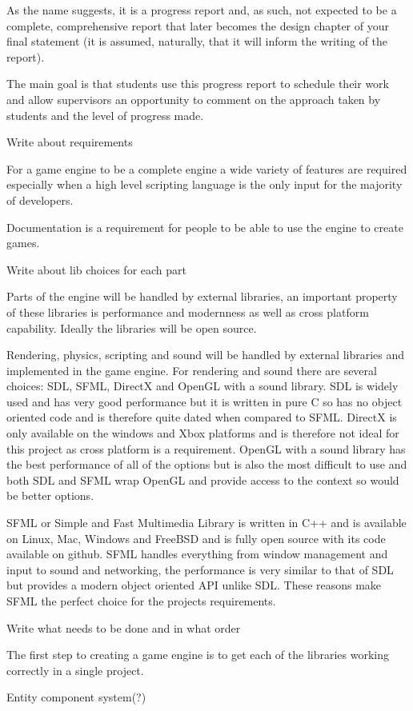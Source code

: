 \documentclass[11pt,a4paper,titlepage]{article}
\begin{document}
As the name suggests, it is a progress report and, as such, not expected to be a complete, comprehensive report
that later becomes the design chapter of your final statement (it is assumed, naturally, that it will inform the
writing of the report).  

The main goal is that students use this progress report to schedule their work and allow supervisors an opportunity to comment on the approach taken by students and the level of progress made.

Write about requirements

	For a game engine to be a complete engine a wide variety of features are required especially when a high level scripting language is the only input for the majority of developers.

	Documentation is a requirement for people to be able to use the engine to create games.

Write about lib choices for each part

	Parts of the engine will be handled by external libraries, an important property of these libraries is performance and modernness as well as cross platform capability. Ideally the libraries will be open source.

	Rendering, physics, scripting and sound will be handled by external libraries and implemented in the game engine. For rendering and sound there are several choices: SDL, SFML, DirectX and OpenGL with a sound library. SDL is widely used and has very good performance but it is written in pure C so has no object oriented code and is therefore quite dated when compared to SFML. DirectX is only available on the windows and Xbox platforms and is therefore not ideal for this project as cross platform is a requirement. OpenGL with a sound library has the best performance of all of the options but is also the most difficult to use and both SDL and SFML wrap OpenGL and provide access to the context so would be better options.

	SFML or Simple and Fast Multimedia Library is written in C++ and is available on Linux, Mac, Windows and FreeBSD and is fully open source with its code available on github. SFML handles everything from window management and input to sound and networking, the performance is very similar to that of SDL but provides a modern object oriented API unlike SDL. These reasons make SFML the perfect choice for the projects requirements.

Write what needs to be done and in what order

	The first step to creating a game engine is to get each of the libraries working correctly in a single project.

	Entity component system(?) 

	\printbibliography{}
\end{document}
